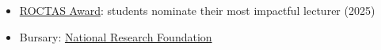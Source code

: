 \documentclass[10pt,a4paper,ragged2e,withhyper]{altacv}
\begin{document}
\begin{paracol}{2}
\switchcolumn* %




\nocite{*}
\AtNextBibliography{\small}
\printbibliography[heading=pubtype,title={\printinfo{\faFile*[regular]}{Journal Articles}},type=article]
\vspace{-1em}
\divider
\AtNextBibliography{\small}
\printbibliography[heading=pubtype,title={\printinfo{\faComments[regular]}{Seminars \& Colloquia}}, type=misc]



\begin{itemize}
	\item \href{http://www.sun.ac.za/english/learning-teaching/ctl/t-l-awards-and-grants/roctas}{ROCTAS Award}:
		students nominate their most impactful lecturer (2025)
	\item Bursary: \href{https://www.nrf.ac.za/}{National Research Foundation}
\end{itemize}


\end{paracol}
\end{document}
